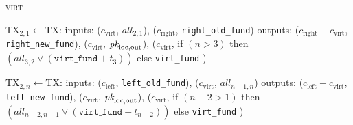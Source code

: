 \begin{center}
\begin{processbox}{\textsc{virt}}
\begin{algorithmic}[1]
          \State $\mathrm{TX}_{2, 1} \gets \mathrm{TX}$:
          \Indent
            \State inputs:
            \Indent
              \State ($c_{\mathrm{virt}}$, $\mathit{all}_{2, 1}$),
              \label{code:virtual-layer:mid-txs:i-is-2:extend-interval-left:virt}
              \State ($c_{\mathrm{right}}$, \texttt{right\_old\_fund})
            \EndIndent
            \State outputs:
            \Indent
              \State ($c_{\mathrm{right}} - c_{\mathrm{virt}}$,
              \texttt{right\_new\_fund}),
              \State ($c_{\mathrm{virt}}$, $\textit{pk}_{\mathrm{loc}, \mathrm{out}}$),
              \State ($c_{\mathrm{virt}}$,
              \Indent
                \State if $(n > 3)$ then $(\mathit{all}_{3, 2}
                \vee (\texttt{virt\_fund} + t_3))$
                \State else \texttt{virt\_fund}
              \EndIndent
              \State )
            \EndIndent
          \EndIndent
        \EndIf

          \State $\mathrm{TX}_{2, n} \gets \mathrm{TX}$:
          \Indent
            \State inputs:
            \Indent
              \State ($c_{\mathrm{left}}$, \texttt{left\_old\_fund}),
              \State ($c_{\mathrm{virt}}$, $\mathit{all}_{n-1, n}$)
            \EndIndent
            \State outputs:
            \Indent
              \State ($c_{\mathrm{left}} - c_{\mathrm{virt}}$,
              \texttt{left\_new\_fund}),
              \State ($c_{\mathrm{virt}}$, $\textit{pk}_{\mathrm{loc}, \mathrm{out}}$),
              \State ($c_{\mathrm{virt}}$,
              \Indent
                \State if $(n-2 > 1)$ then $(\mathit{all}_{n-2, n-1} \vee
                (\texttt{virt\_fund} + t_{n-2}))$
                \State else \texttt{virt\_fund}
              \EndIndent
              \State )
            \EndIndent
          \EndIndent
        \EndIf


\end{algorithmic}
\end{processbox}
\end{center}
